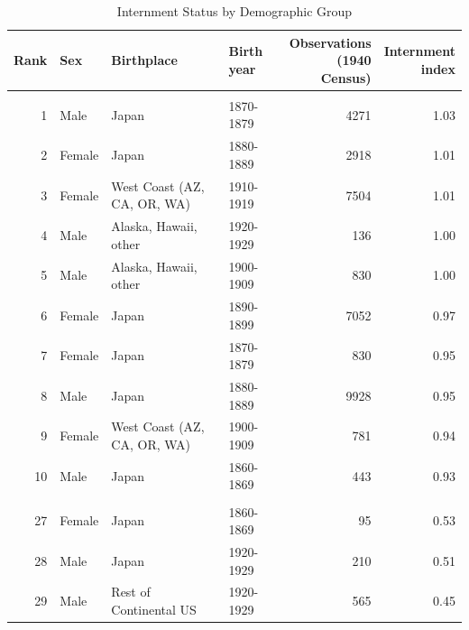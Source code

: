 \documentclass[12pt]{article}
\begin{document}
\begin{table}[!h]
\centering
\caption{\label{tab:tbl:intern_groups}Internment Status by Demographic Group}
\centering
\begin{threeparttable}
\begin{adjustbox}{width=\textwidth, center}
\begin{tabular}[t]{rlllrr}
\toprule
Rank & Sex & Birthplace & Birth year & \shortstack{Observations\\(1940 Census)} & \shortstack{Internment\\index}\\
\midrule
\addlinespace[0.3em]
\multicolumn{6}{l}{\textbf{Most interned}}\\
\hspace{1em}1 & Male & Japan & 1870-1879 & 4271 & 1.03\\
\hspace{1em}2 & Female & Japan & 1880-1889 & 2918 & 1.01\\
\hspace{1em}3 & Female & West Coast (AZ, CA, OR, WA) & 1910-1919 & 7504 & 1.01\\
\hspace{1em}4 & Male & Alaska, Hawaii, other & 1920-1929 & 136 & 1.00\\
\hspace{1em}5 & Male & Alaska, Hawaii, other & 1900-1909 & 830 & 1.00\\
\hspace{1em}6 & Female & Japan & 1890-1899 & 7052 & 0.97\\
\hspace{1em}7 & Female & Japan & 1870-1879 & 830 & 0.95\\
\hspace{1em}8 & Male & Japan & 1880-1889 & 9928 & 0.95\\
\hspace{1em}9 & Female & West Coast (AZ, CA, OR, WA) & 1900-1909 & 781 & 0.94\\
\hspace{1em}10 & Male & Japan & 1860-1869 & 443 & 0.93\\
\addlinespace[0.3em]
\multicolumn{6}{l}{\textbf{Medium internment}}\\
\hspace{1em}27 & Female & Japan & 1860-1869 & 95 & 0.53\\
\hspace{1em}28 & Male & Japan & 1920-1929 & 210 & 0.51\\
\hspace{1em}29 & Male & Rest of Continental US & 1920-1929 & 565 & 0.45\\

\end{tabular}
\end{adjustbox}
\end{threeparttable}
\end{table}
\end{document}
